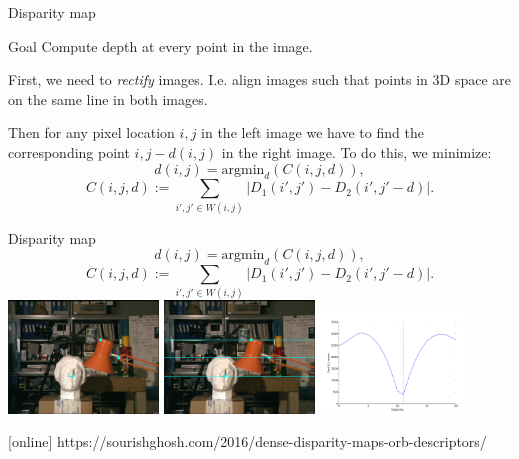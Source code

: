 \documentclass{beamer}
\begin{document}
\begin{frame}{Disparity map}
    \begin{block}{Goal}
        Compute depth at every point in the image.
    \end{block}
    First, we need to \emph{rectify} images. I.e. align images such that points in 3D space are on the same line in both images.
    
    Then for any pixel location $i,j$ in the left image we have to find the corresponding point $i, j-d(i,j)$ in the right image. To do this, we minimize:
    \[ d(i,j) = \textrm{argmin}_d(C(i,j,d)),\]
    \[ C(i,j,d) := \sum_{i',j' \in W(i,j)} \left| D_1(i',j') - D_2(i', j'-d) \right|.\]

\end{frame}
\begin{frame}{Disparity map}
    \[ d(i,j) = \textrm{argmin}_d(C(i,j,d)),\]
    \[ C(i,j,d) := \sum_{i',j' \in W(i,j)} \left| D_1(i',j') - D_2(i', j'-d) \right|.\]
    \centering
    \includegraphics[width=0.3\textwidth]{images/epi-left.png}
    \includegraphics[width=0.3\textwidth]{images/epi-right.png}
    \includegraphics[width=0.3\textwidth]{images/epipolar_cost.png}

    \begin{thebibliography}{9}
[online]
 https://sourishghosh.com/2016/dense-disparity-maps-orb-descriptors/
\end{thebibliography}
\end{frame}
\end{document}
